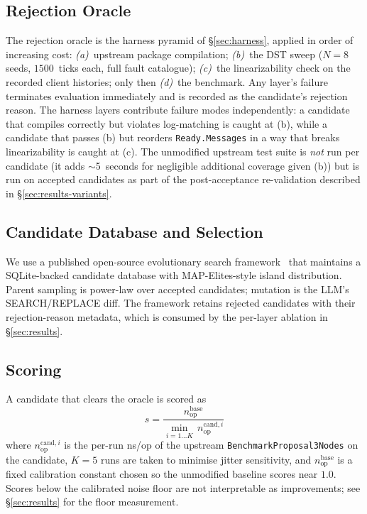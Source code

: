 \documentclass{article}
\begin{document}
\subsection{Rejection Oracle}
The rejection oracle is the harness pyramid of \S\ref{sec:harness},
applied in order of increasing cost: \emph{(a)}~upstream package
compilation; \emph{(b)}~the DST sweep ($N=8$ seeds, $1500$~ticks
each, full fault catalogue); \emph{(c)}~the linearizability check on
the recorded client histories; only then \emph{(d)}~the benchmark.
Any layer's failure terminates evaluation immediately and is
recorded as the candidate's rejection reason. The harness layers
contribute failure modes independently: a candidate that compiles
correctly but violates log-matching is caught at (b), while a
candidate that passes (b) but reorders \texttt{Ready.Messages} in a
way that breaks linearizability is caught at (c). The unmodified
upstream test suite is \emph{not} run per candidate (it adds
$\sim$5~seconds for negligible additional coverage given (b)) but
is run on accepted candidates as part of the post-acceptance
re-validation described in \S\ref{sec:results-variants}.

\subsection{Candidate Database and Selection}
We use a published open-source evolutionary search
framework~\cite{openevolve} that maintains a SQLite-backed candidate
database with MAP-Elites-style island distribution. Parent sampling
is power-law over accepted candidates; mutation is the LLM's
SEARCH/REPLACE diff. The framework retains rejected candidates with
their rejection-reason metadata, which is consumed by the per-layer
ablation in \S\ref{sec:results}.

\subsection{Scoring}
A candidate that clears the oracle is scored as
\[
  s = \frac{n^{\text{base}}_\text{op}}{\min_{i=1\ldots K}\, n^{\text{cand},i}_\text{op}}
\]
where $n^{\text{cand},i}_\text{op}$ is the per-run ns/op of the
upstream \texttt{BenchmarkProposal3Nodes} on the candidate, $K=5$
runs are taken to minimise jitter sensitivity, and
$n^{\text{base}}_\text{op}$ is a fixed calibration constant chosen so
the unmodified baseline scores near $1.0$. Scores below the
calibrated noise floor are not interpretable as improvements; see
\S\ref{sec:results} for the floor measurement.
\end{document}
